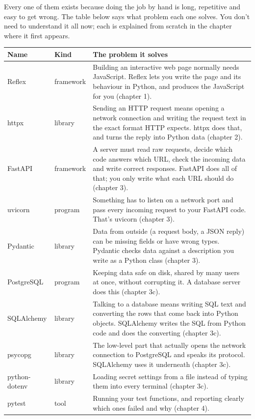 Every one of them exists because doing the job by hand is long, repetitive and easy to get wrong. The table below says what problem each one solves. You don't need to understand it all now; each is explained from scratch in the chapter where it first appears.

\begin{center}
\begin{tabularx}{\textwidth}{@{}l l X@{}}
\toprule
\textbf{Name} & \textbf{Kind} & \textbf{The problem it solves} \\
\midrule
Reflex & framework & Building an interactive web page normally needs JavaScript. Reflex lets you write the page and its behaviour in Python, and produces the JavaScript for you (chapter 1). \\
httpx & library & Sending an HTTP request means opening a network connection and writing the request text in the exact format HTTP expects. httpx does that, and turns the reply into Python data (chapter 2). \\
FastAPI & framework & A server must read raw requests, decide which code answers which URL, check the incoming data and write correct responses. FastAPI does all of that; you only write what each URL should do (chapter 3). \\
uvicorn & program & Something has to listen on a network port and pass every incoming request to your FastAPI code. That's uvicorn (chapter 3). \\
Pydantic & library & Data from outside (a request body, a JSON reply) can be missing fields or have wrong types. Pydantic checks data against a description you write as a Python class (chapter 3). \\
PostgreSQL & program & Keeping data safe on disk, shared by many users at once, without corrupting it. A database server does this (chapter 3c). \\
SQLAlchemy & library & Talking to a database means writing SQL text and converting the rows that come back into Python objects. SQLAlchemy writes the SQL from Python code and does the converting (chapter 3c). \\
psycopg & library & The low-level part that actually opens the network connection to PostgreSQL and speaks its protocol. SQLAlchemy uses it underneath (chapter 3c). \\
python-dotenv & library & Loading secret settings from a file instead of typing them into every terminal (chapter 3c). \\
pytest & tool & Running your test functions, and reporting clearly which ones failed and why (chapter 4). \\

\end{tabularx}
\end{center}
